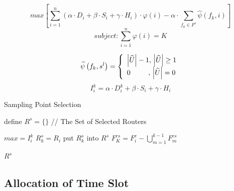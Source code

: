 \documentclass[conference,compsoc]{IEEEtran}
\begin{document}
\begin{equation}
max [\sum_{i=1}^n (\alpha \cdot {D_{i}} + \beta \cdot {S_{i}} + \gamma \cdot {H_{i}}) \cdot \varphi{(i)} - \alpha \cdot\sum_{f_k \in F^c} \widehat{\psi}{(f_k,i)}]
\end{equation}
\begin{equation}
subject:\sum_{i=1}^{n} \varphi(i) = K
\end{equation}

\begin{equation}
\widehat{\psi} \left( {{f_k},{s^l}} \right) = \left\{ \begin{array}{l}
\left| \widehat{U} \right| - 1,{\rm{    }}\left| \widehat{U} \right| \ge 1\\
{\rm{   }}0\quad \quad \; \; ,\, \left| \widehat{U} \right| = 0
\end{array} \right.
\end{equation}
\begin{equation}
I_{i}^{k}=\alpha \cdot D_{i}^{k}+\beta \cdot {{S}_{i}}+\gamma \cdot {{H}_{i}}
\end{equation}

\begin{algorithm}[h]
\caption{Sampling Point Selection}
\begin{algorithmic}[1]

\STATE define $R^s=\{\}$  //  The Set of Selected Routers


\STATE $max = I_i^k$
\STATE $R^s_k = R_i$
\ENDIF
\ENDFOR
\STATE put $R^s_k$ into $R^s$
\STATE $F_K^{cs} = F_i^c- \bigcup_{m=1}^{k-1}F_m^{cs}$ 
\ENDFOR

\RETURN $R^s$
\label{code:recentEnd}
\end{algorithmic}
\end{algorithm}


 





\subsection{Allocation of Time Slot}
\end{document}
